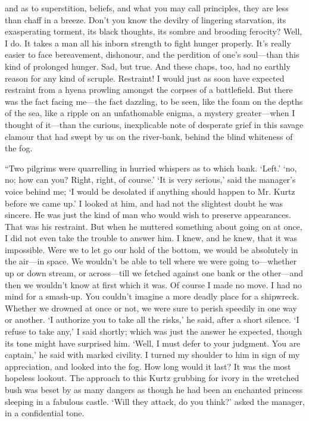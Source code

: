 \documentclass[12pt]{report}
\begin{document}
and as to superstition, beliefs, and what you may call principles, they
are less than chaff in a breeze. Don't you know the devilry of lingering
starvation, its exasperating torment, its black thoughts, its sombre and
brooding ferocity? Well, I do. It takes a man all his inborn strength to
fight hunger properly. It's really easier to face bereavement,
dishonour, and the perdition of one's soul---than this kind of prolonged
hunger. Sad, but true. And these chaps, too, had no earthly reason for
any kind of scruple. Restraint! I would just as soon have expected
restraint from a hyena prowling amongst the corpses of a battlefield.
But there was the fact facing me---the fact dazzling, to be seen, like
the foam on the depths of the sea, like a ripple on an unfathomable
enigma, a mystery greater---when I thought of it---than the curious,
inexplicable note of desperate grief in this savage clamour that had
swept by us on the river-bank, behind the blind whiteness of the fog.

``Two pilgrims were quarrelling in hurried whispers as to which bank.
`Left.' `no, no; how can you? Right, right, of course.' `It is very
serious,' said the manager's voice behind me; `I would be desolated if
anything should happen to Mr. Kurtz before we came up.' I looked at him,
and had not the slightest doubt he was sincere. He was just the kind of
man who would wish to preserve appearances. That was his restraint. But
when he muttered something about going on at once, I did not even take
the trouble to answer him. I knew, and he knew, that it was impossible.
Were we to let go our hold of the bottom, we would be absolutely in the
air---in space. We wouldn't be able to tell where we were going
to---whether up or down stream, or across---till we fetched against one
bank or the other---and then we wouldn't know at first which it was. Of
course I made no move. I had no mind for a smash-up. You couldn't
imagine a more deadly place for a shipwreck. Whether we drowned at once
or not, we were sure to perish speedily in one way or another. `I
authorize you to take all the risks,' he said, after a short silence. `I
refuse to take any,' I said shortly; which was just the answer he
expected, though its tone might have surprised him. `Well, I must defer
to your judgment. You are captain,' he said with marked civility. I
turned my shoulder to him in sign of my appreciation, and looked into
the fog. How long would it last? It was the most hopeless lookout. The
approach to this Kurtz grubbing for ivory in the wretched bush was beset
by as many dangers as though he had been an enchanted princess sleeping
in a fabulous castle. `Will they attack, do you think?' asked the
manager, in a confidential tone.
\end{document}
